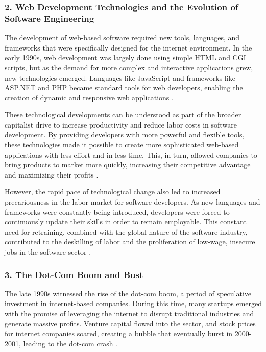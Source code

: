 \begin{refsection}
\begin{multicols}{2}
{\subsubsection*{2. Web Development Technologies and the Evolution of Software Engineering}

The development of web-based software required new tools, languages, and frameworks that were specifically designed for the internet environment. In the early 1990s, web development was largely done using simple HTML and CGI scripts, but as the demand for more complex and interactive applications grew, new technologies emerged. Languages like JavaScript and frameworks like ASP.NET and PHP became standard tools for web developers, enabling the creation of dynamic and responsive web applications \cite{mcconell1999web, flanagan2002javascript}.

These technological developments can be understood as part of the broader capitalist drive to increase productivity and reduce labor costs in software development. By providing developers with more powerful and flexible tools, these technologies made it possible to create more sophisticated web-based applications with less effort and in less time. This, in turn, allowed companies to bring products to market more quickly, increasing their competitive advantage and maximizing their profits \cite{fuchs2014digital}.

However, the rapid pace of technological change also led to increased precariousness in the labor market for software developers. As new languages and frameworks were constantly being introduced, developers were forced to continuously update their skills in order to remain employable. This constant need for retraining, combined with the global nature of the software industry, contributed to the deskilling of labor and the proliferation of low-wage, insecure jobs in the software sector \cite{scholz2013digital}.

\subsubsection*{3. The Dot-Com Boom and Bust}

The late 1990s witnessed the rise of the dot-com boom, a period of speculative investment in internet-based companies. During this time, many startups emerged with the promise of leveraging the internet to disrupt traditional industries and generate massive profits. Venture capital flowed into the sector, and stock prices for internet companies soared, creating a bubble that eventually burst in 2000-2001, leading to the dot-com crash \cite{cassidy2002dot}.

}
\end{multicols}
\end{refsection}
